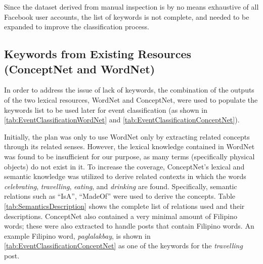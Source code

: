 Since the dataset derived from manual inspection is by no means exhaustive of all Facebook user accounts, the list of keywords is not complete, and needed to be expanded to improve the classification process. 

\subsection{Keywords from Existing Resources (ConceptNet and WordNet)}
In order to address the issue of lack of keywords, the combination of the outputs of the two lexical resources, WordNet and ConceptNet, were used to populate the keywords list to be used later for event classification (as shown in \ref{tab:EventClassificationWordNet} and \ref{tab:EventClassificationConceptNet}). 

Initially, the plan was only to use WordNet only by extracting related concepts through its related senses. However, the lexical knowledge contained in WordNet was found to be insufficient for our purpose, as many terms (specifically physical objects) do not exist in it. To increase the coverage, ConceptNet's lexical and semantic knowledge was utilized to derive related contexts in which the words \textit{celebrating}, \textit{travelling}, \textit{eating}, and \textit{drinking} are found. Specifically, semantic relations such as ``IsA'', ``MadeOf'' were used to derive the concepts. Table \ref{tab:SemanticsDescription} shows the complete list of relations used and their descriptions.  ConceptNet also contained a very minimal amount of Filipino words; these were also extracted to handle posts that contain Filipino words. An example Filipino word, \textit{paglalakbay}, is shown in \ref{tab:EventClassificationConceptNet} as one of the keywords for the \textit{travelling} post.

